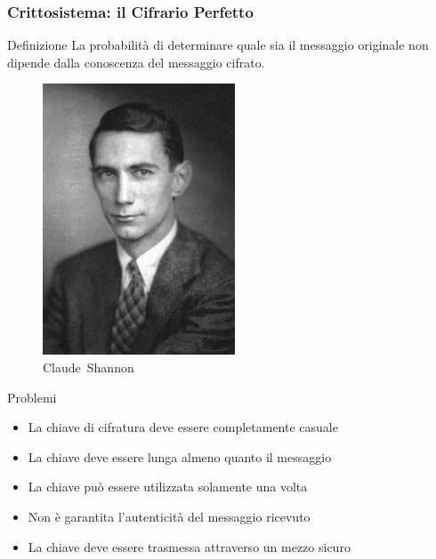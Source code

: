 \documentclass{beamer}
\begin{document}
\begin{frame}
  \frametitle{Crittosistema: il Cifrario Perfetto}

  \begin{block}{Definizione}
    La probabilità di determinare quale sia il messaggio originale non
    dipende dalla conoscenza del messaggio cifrato.
  \end{block}

  \begin{minipage}{.25\linewidth}
    \begin{figure}
      \centering
      \includegraphics[width=.9\linewidth]{shannon.jpeg}
      \caption{Claude~Shannon}
      \label{fig:shannon}
    \end{figure}
  \end{minipage}
  \pause
  \hfill
  \begin{minipage}{.70\linewidth}
    \begin{block}{Problemi}
      \begin{itemize}
        \item La chiave di cifratura deve essere completamente casuale
        \item La chiave deve essere lunga almeno quanto il messaggio
        \item La chiave può essere utilizzata solamente una volta
        \item Non è garantita l'autenticità del messaggio ricevuto
        \item<3-> La chiave deve essere trasmessa attraverso un mezzo sicuro
      \end{itemize}
    \end{block}
  \end{minipage}


\end{frame}
\end{document}
